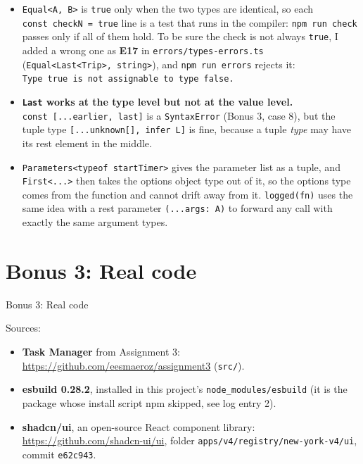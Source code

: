 \documentclass[
  10pt,
]{article}
\providecommand{\tightlist}{%
  \setlength{\itemsep}{0pt}\setlength{\parskip}{0pt}}
\begin{document}
\begin{itemize}
\tightlist
\item
  \texttt{Equal\textless{}\allowbreak{}A,\ B\textgreater{}\allowbreak{}}
  is \texttt{true} only when the two types are identical, so each
  \texttt{const\ checkN\ =\ true} line is a test that runs in the
  compiler: \texttt{npm\ run\ check} passes only if all of them hold. To
  be sure the check is not always \texttt{true}, I added a wrong one as
  \textbf{E17} in
  \texttt{errors/\allowbreak{}types-errors.\allowbreak{}ts}
  (\texttt{Equal\textless{}\allowbreak{}Last\textless{}\allowbreak{}Trip\textgreater{}\allowbreak{},\ string\textgreater{}\allowbreak{}}),
  and \texttt{npm\ run\ errors} rejects it:
  \texttt{Type\ \allowbreak{}\textquotesingle{}true\allowbreak{}\textquotesingle{}\ is\ not\ assignable\ to\ type\ \allowbreak{}\textquotesingle{}false\allowbreak{}\textquotesingle{}.\allowbreak{}}
\item
  \textbf{\texttt{Last} works at the type level but not at the value
  level.}
  \texttt{const\ {[}.\allowbreak{}.\allowbreak{}.\allowbreak{}earlier,\ last{]\allowbreak{}}}
  is a \texttt{SyntaxError} (Bonus 3, case 8), but the tuple type
  \texttt{{[}.\allowbreak{}.\allowbreak{}.\allowbreak{}unknown{[}{]\allowbreak{}},\ infer\ L{]\allowbreak{}}}
  is fine, because a tuple \emph{type} may have its rest element in the
  middle.
\item
  \texttt{Parameters\textless{}\allowbreak{}typeof\ startTimer\textgreater{}\allowbreak{}}
  gives the parameter list as a tuple, and
  \texttt{First\textless{}\allowbreak{}.\allowbreak{}.\allowbreak{}.\allowbreak{}\textgreater{}\allowbreak{}}
  then takes the options object type out of it, so the options type
  comes from the function and cannot drift away from it.
  \texttt{logged(fn)} uses the same idea with a rest parameter
  \texttt{(.\allowbreak{}.\allowbreak{}.\allowbreak{}args:\ A)} to
  forward any call with exactly the same argument types.
\end{itemize}

\hypertarget{bonus-3-real-code}{%
\section{Bonus 3: Real code}\label{bonus-3-real-code}}

Bonus 3: Real code

Sources:

\begin{itemize}
\tightlist
\item
  \textbf{Task Manager} from Assignment 3:
  \url{https://github.com/eesmaeroz/assignment3}
  (\texttt{src/\allowbreak{}}).
\item
  \textbf{esbuild 0.28.2}, installed in this project's
  \texttt{node\_modules/\allowbreak{}esbuild} (it is the package whose
  install script npm skipped, see log entry 2).
\item
  \textbf{shadcn/ui}, an open-source React component library:
  \url{https://github.com/shadcn-ui/ui}, folder
  \texttt{apps/\allowbreak{}v4/\allowbreak{}registry/\allowbreak{}new-york-v4/\allowbreak{}ui},
  commit \texttt{e62c943}.
\end{itemize}
\end{document}

